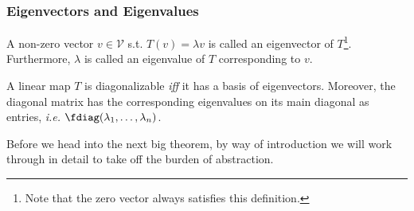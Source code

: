 \subsubsection{Eigenvectors and Eigenvalues}\label{subsubsec-eigenvectors-and-eigenvalues}

\begin{definition}\label{def-eigenvector-eigenvalue}
	A non-zero vector $v\in\mathcal{V}$ s.t. $T(v)=\lambda v$ is called an eigenvector
	of $T$\footnote{Note that the zero vector always satisfies this definition.}.
	Furthermore, $\lambda$ is called an eigenvalue of $T$ corresponding to $v$.
\end{definition}

\begin{definition}\label{def-diagonalizable-linear-map}
	A linear map $T$ is diagonalizable \textit{iff} it has a basis of eigenvectors.
	Moreover, the diagonal matrix has the corresponding eigenvalues on its main
	diagonal as entries, \textit{i.e.} $\fdiag(\lambda_1,\dots,\lambda_n)$.
\end{definition}

\begin{rem}
	Before we head into the next big theorem, by way of introduction we will work through
	 in detail to take off the burden of abstraction.
\end{rem}

